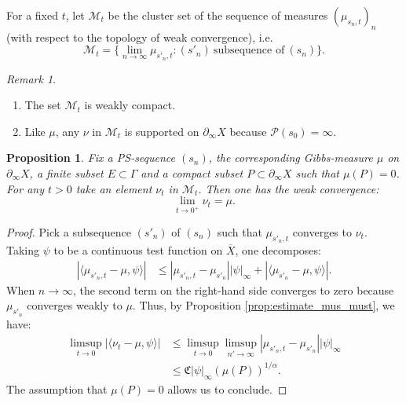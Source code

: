 \documentclass[12pt]{amsbook}%
\newtheorem{prop}[thm]{Proposition}
\theoremstyle{definition}
\theoremstyle{remark}
\newtheorem{rem}[thm]{Remark}
\numberwithin{section}{chapter}
\numberwithin{subsection}{section}
\numberwithin{figure}{chapter}
\def\cM{{\mathscr{M}}}
\def\cP{{\mathscr{P}}}
\def\al{\alpha}
\def\geo{\partial_\infty}
\def\ol{\overline}
\begin{document}
{{For a fixed $t$, let $\cM_t$ be the cluster set of the sequence of measures $(\mu_{s_n,t})_n$ (with respect to the topology of weak convergence), i.e.\
\begin{equation}\label{eq:def_Mt}
\cM_t=\{\lim_{n\rightarrow \infty}\mu_{s'_n,t}: (s'_n) \ \text{subsequence of} \ (s_n)\}.
\end{equation} 
\begin{rem}\label{rem:support_mut}
\begin{enumerate}
\item The set $\cM_t$ is weakly compact. 
\item Like $\mu$, any $\nu$ in $\cM_t$ is supported on $\geo X$ because $\cP(s_0)=\infty$. %
\end{enumerate}
\end{rem}


\begin{prop} \label{prop:double_limit_ordered}
Fix a PS-sequence $(s_n)$, the corresponding Gibbs-measure $\mu$ on $\geo X$, a finite subset $E\subset \Gamma$ and a compact 
subset $P\subset \geo X$ such that $\mu(P)=0$. For any $t>0$ take an element $\nu_t$ in $\cM_t$. Then one has the weak convergence: 
\begin{equation*}
\lim_{t \rightarrow  0^+}\nu_t = \mu. 
\end{equation*}
\end{prop}

\begin{proof}
Pick a subsequence $(s'_n)$ of $(s_n)$ such that $\mu_{s'_n,t}$ converges to $\nu_t$. Taking $\psi$ to be a continuous test function on $\ol{X}$, one decomposes:
\begin{align*}
|\langle \mu_{s'_n,t} - \mu , \psi \rangle| &\leqslant |\mu_{s'_n,t} - \mu_{s'_n}|  |\psi|_\infty + |\langle \mu_{s'_n} - \mu , \psi \rangle|. 
\end{align*}
When $n\rightarrow\infty$, the second term on the right-hand side converges to zero because $\mu_{s'_n}$ converges weakly to $\mu$. Thus, by Proposition \ref{prop:estimate_mus_must}, we have:
\begin{align*}
\limsup_{t\rightarrow 0}|\langle \nu_t - \mu , \psi \rangle| &\leqslant \limsup_{t\rightarrow 0} \limsup_{n'\rightarrow \infty} |\mu_{s'_n,t} - \mu_{s'_n}|  |\psi|_\infty\\
& 
\leqslant \mathfrak{C}|\psi|_\infty\left(\mu(P)\right)^{1/\al}.
\end{align*}
The assumption that $\mu(P)=0$ allows us to conclude.
\end{proof}



}}
\end{document}

